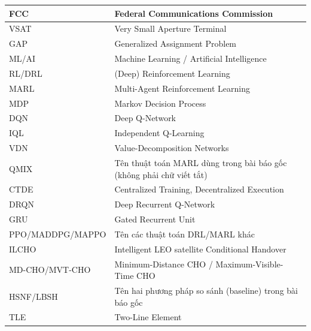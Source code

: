 \begin{longtable}{|p{3.2cm}|p{11.3cm}|}
\hline
FCC & Federal Communications Commission \\
\hline
VSAT & Very Small Aperture Terminal \\
\hline
GAP & Generalized Assignment Problem \\
\hline
ML/\allowbreak AI & Machine Learning / Artificial Intelligence \\
\hline
RL/\allowbreak DRL & (Deep) Reinforcement Learning \\
\hline
MARL & Multi-Agent Reinforcement Learning \\
\hline
MDP & Markov Decision Process \\
\hline
DQN & Deep Q-Network \\
\hline
IQL & Independent Q-Learning \\
\hline
VDN & Value-Decomposition Networks \\
\hline
QMIX & Tên thuật toán MARL dùng trong bài báo gốc (không phải chữ viết tắt) \\
\hline
CTDE & Centralized Training, Decentralized Execution \\
\hline
DRQN & Deep Recurrent Q-Network \\
\hline
GRU & Gated Recurrent Unit \\
\hline
PPO/\allowbreak MADDPG/\allowbreak MAPPO & Tên các thuật toán DRL/MARL khác \\
\hline
ILCHO & Intelligent LEO satellite Conditional Handover \\
\hline
MD-CHO/\allowbreak MVT-CHO & Minimum-Distance CHO / Maximum-Visible-Time CHO \\
\hline
HSNF/\allowbreak LBSH & Tên hai phương pháp so sánh (baseline) trong bài báo gốc \\
\hline
TLE & Two-Line Element \\
\hline
\end{longtable}
